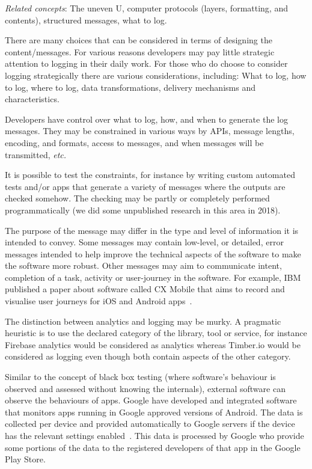 \emph{Related concepts}: The uneven U, computer protocols (layers, formatting, and contents), structured messages, what to log. %

There are many choices that can be considered in terms of designing the content/messages. For various reasons developers may pay little strategic attention to logging in their daily work. For those who do choose to consider logging strategically there are various considerations, including:
What to log, how to log, where to log, data transformations, delivery mechanisms and characteristics.

Developers have control over what to log, how, and when to generate the log messages. They may be constrained in various ways by APIs, message lengths, encoding, and formats, access to messages, and when messages will be transmitted, \emph{etc.} 

It is possible to test the constraints, for instance by writing custom automated tests and/or apps that generate a variety of messages where the outputs are checked somehow. The checking may be partly or completely performed programmatically (we did some unpublished research in this area in 2018).

The purpose of the message may differ in the type and level of information it is intended to convey. Some messages may contain low-level, or detailed, error messages intended to help improve the technical aspects of the software to make the software more robust. Other messages may aim to communicate intent, completion of a task, activity or user-journey in the software. For example, IBM published a paper about software called CX Mobile that aims to record and visualise user journeys for iOS and Android apps~\cite{hu_tealeaf_cxmobile}.


The distinction between analytics and logging may be murky. A pragmatic heuristic is to use the declared category of the library, tool or service, for instance Firebase analytics would be considered as analytics whereas Timber.io would be considered as logging even though both contain aspects of the other category.

Similar to the concept of black box testing (where software's behaviour is observed and assessed without knowing the internals), external software can observe the behaviours of apps. Google have developed and integrated software that monitors apps running in Google approved versions of Android. The data is collected per device and provided automatically to Google servers if the device has the relevant settings enabled~\cite{google_play_share_usage_and_diagnostics_info_with_google}. This data is processed by Google who provide some portions of the data to the registered developers of that app in the Google Play Store.

